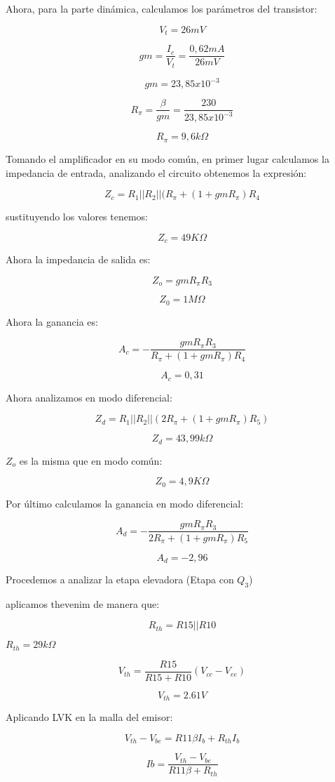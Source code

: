 \documentclass{article}
\begin{document}
Ahora, para la parte dinámica, calculamos los parámetros del transistor:

$$V_t = 26 mV$$

$$gm = \frac{I_c}{V_t} = \frac{0,62 mA}{26 mV}$$

$$gm = 23,85 x 10 ^{-3}$$

$$R_\pi = \frac{\beta}{gm} = \frac{230}{23,85x10^{-3}}$$

$$ R_\pi = 9,6k \Omega$$

Tomando el amplificador en su modo común, en primer lugar calculamos la impedancia de entrada, analizando el circuito obtenemos la expresión:

$$ Z_c = R_1 || R_2 || (R_\pi + (1 + gmR_\pi)R_4$$

sustituyendo los valores tenemos:

$$ Z_c = 49K\Omega$$

Ahora la impedancia de salida es:

$$ Z_o = gmR_\pi R_3$$

$$ Z_0 = 1 M\Omega$$

Ahora la ganancia es:

$$A_c = - \frac{ gmR_\pi R_3}{R_\pi + (1 + gmR_\pi)R_4}$$

$$A_c = 0,31$$

Ahora analizamos en modo diferencial:

$$Z_d = R_1 || R_2 || (2R_\pi + (1+gmR_\pi )R_5)$$

$$Z_d = 43,99 k\Omega$$

$Z_o$ es la misma que en modo común:

$$Z_0 = 4,9 K\Omega$$

Por último calculamos la ganancia en modo diferencial:

$$A_d = -\frac{gmR_\pi R_3}{2R_\pi + (1 + gmR_\pi) R_5}$$

$$A_d = -2,96 $$

Procedemos a analizar la etapa elevadora (Etapa con $Q_3$)

aplicamos thevenim de manera que:

$$R_{th}= R15 || R10$$

$R_{th}=29 k\Omega$

$$V_{th} = \frac{R15}{R15 + R10} (V_{cc} - V_{ee})$$

$$V_{th} = 2.61 V $$

Aplicando LVK en la malla del emisor:

$$V_{th} - V_{be} = R11 \beta I_{b} + R_{th}I_b$$

$$ Ib = \frac{V_{th} - V_{be}}{R11\beta + R_{th}}$$
\end{document}
